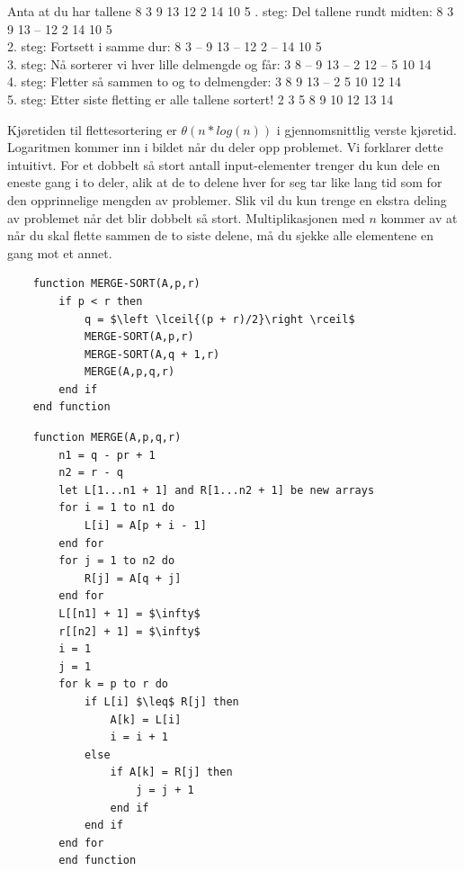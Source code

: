 \begin{boxed}
Anta at du har tallene 8 3 9 13 12 2 14 10 5
\newline {}. steg: Del tallene rundt midten:  \hfill 8 3 9 13 – 12 2 14 10 5\\
2. steg: Fortsett i samme dur:  \hfill 8 3 – 9 13 – 12 2 – 14 10 5\\
3. steg: Nå sorterer vi hver lille delmengde og får:   \hfill 3 8 – 9 13 – 2 12 – 5 10 14\\
4. steg: Fletter så sammen to og to delmengder: \hfill 3 8 9 13 – 2 5 10 12 14\\
5. steg: Etter siste fletting er alle tallene sortert!    \hfill 2 3 5 8 9 10 12 13 14
\end{boxed}

\noindent Kjøretiden til flettesortering er \textbf{$\theta(n*log(n))$} i gjennomsnittlig verste kjøretid. Logaritmen kommer inn i bildet når du deler opp problemet. Vi forklarer dette intuitivt. For et dobbelt så stort antall input-elementer trenger du kun dele en eneste gang i to deler, alik at de to delene hver for seg tar like lang tid som for den opprinnelige mengden av problemer. Slik vil du kun trenge en ekstra deling av problemet når det blir dobbelt så stort. Multiplikasjonen med $n$ kommer av at når du skal flette sammen de to siste delene, må du sjekke alle elementene en gang mot et annet.

\begin{lstlisting}
    function MERGE-SORT(A,p,r)
    	if p < r then
    		q = $\left \lceil{(p + r)/2}\right \rceil$
    		MERGE-SORT(A,p,r)
    		MERGE-SORT(A,q + 1,r)
    		MERGE(A,p,q,r)
    	end if
    end function
\end{lstlisting}

\begin{lstlisting}
    function MERGE(A,p,q,r)
	    n1 = q - pr + 1
    	n2 = r - q
	    let L[1...n1 + 1] and R[1...n2 + 1] be new arrays
        for i = 1 to n1 do
	        L[i] = A[p + i - 1]
        end for
        for j = 1 to n2 do
        	R[j] = A[q + j]
        end for
        L[[n1] + 1] = $\infty$
        r[[n2] + 1] = $\infty$
        i = 1
        j = 1
        for k = p to r do
        	if L[i] $\leq$ R[j] then
        		A[k] = L[i]
        		i = i + 1
        	else
        		if A[k] = R[j] then
        			j = j + 1
        		end if
        	end if
        end for
        end function
\end{lstlisting}

